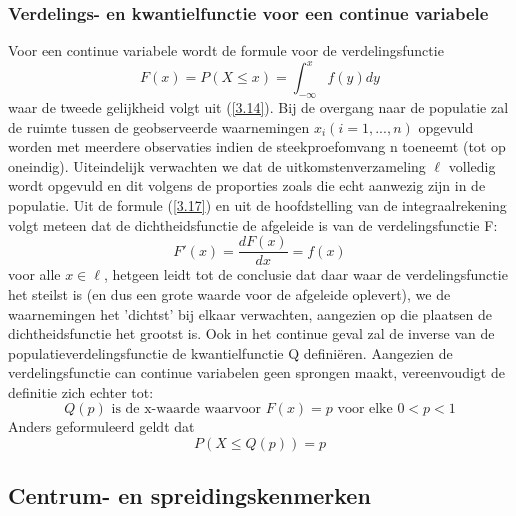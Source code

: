 \documentclass[titlepage]{article}
\numberwithin{equation}{section}
\begin{document}
 \subsubsection{Verdelings- en kwantielfunctie voor een continue variabele}
 Voor een continue variabele wordt de formule voor de verdelingsfunctie
 \begin{equation}
 	F(x) = P(X \leq x) = \int_{-\infty}^x f(y)dy
 	\label{3.17}
 \end{equation}
 waar de tweede gelijkheid volgt uit (\ref{3.14}).\newline\newline
 Bij de overgang naar de populatie zal de ruimte tussen de geobserveerde waarnemingen $x_i (i=1, ... , n)$ opgevuld worden met meerdere observaties indien de steekproefomvang n toeneemt (tot op oneindig). Uiteindelijk verwachten we dat de uitkomstenverzameling $\ell$ volledig wordt opgevuld en dit volgens de proporties zoals die echt aanwezig zijn in de populatie.\newline\newline
 Uit de formule (\ref{3.17}) en uit de hoofdstelling van de integraalrekening volgt meteen dat de dichtheidsfunctie de afgeleide is van de verdelingsfunctie F:
 \begin{equation}
 	F'(x) = \frac{dF(x)}{dx}=f(x)
 	\label{3.18}
 \end{equation}
 voor alle $x \in \ell$, hetgeen leidt tot de conclusie dat daar waar de verdelingsfunctie het steilst is (en dus een grote waarde voor de afgeleide oplevert), we de waarnemingen het 'dichtst' bij elkaar verwachten, aangezien op die plaatsen de dichtheidsfunctie het grootst is.\newline\newline
 Ook in het continue geval zal de inverse van de populatieverdelingsfunctie de kwantielfunctie Q definiëren. Aangezien de verdelingsfunctie can continue variabelen geen sprongen maakt, vereenvoudigt de definitie zich echter tot:
 \begin{equation}
 	Q(p)\text{  is de x-waarde waarvoor  } F(x)=p \text{  voor elke  } 0<p<1
 	\label{3.19}
 \end{equation}
 Anders geformuleerd geldt dat
 \begin{equation}
 	P(X\leq Q(p)) = p
 	\label{3.20}
 \end{equation}
 \subsection{Centrum- en spreidingskenmerken}
\end{document}

